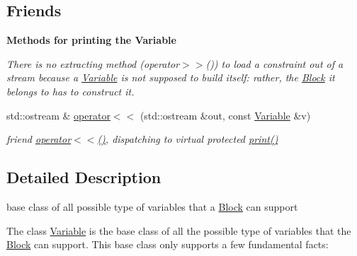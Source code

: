 \subsection*{Friends}
\begin{Indent}\textbf{ Methods for printing the Variable}\par
{\em There is no extracting method (operator$>$$>$()) to load a constraint out of a stream because a \mbox{\hyperlink{class_s_m_spp__di__unipi__it_1_1_variable}{Variable}} is not supposed to build itself\+: rather, the \mbox{\hyperlink{class_s_m_spp__di__unipi__it_1_1_block}{Block}} it belongs to has to construct it. }\begin{DoxyCompactItemize}
\item 
std\+::ostream \& \mbox{\hyperlink{class_s_m_spp__di__unipi__it_1_1_variable_a18ae89d67d3eb2df1392ec86afe3eeb1}{operator$<$$<$}} (std\+::ostream \&out, const \mbox{\hyperlink{class_s_m_spp__di__unipi__it_1_1_variable}{Variable}} \&v)
\begin{DoxyCompactList}\small\item\em friend \mbox{\hyperlink{class_s_m_spp__di__unipi__it_1_1_variable_a18ae89d67d3eb2df1392ec86afe3eeb1}{operator$<$$<$()}}, dispatching to virtual protected \mbox{\hyperlink{class_s_m_spp__di__unipi__it_1_1_variable_a2e7b9c9148a98c5c342e8c25cac95926}{print()}} \end{DoxyCompactList}\end{DoxyCompactItemize}
\end{Indent}


\subsection{Detailed Description}
base class of all possible type of variables that a \mbox{\hyperlink{class_s_m_spp__di__unipi__it_1_1_block}{Block}} can support 

The class \mbox{\hyperlink{class_s_m_spp__di__unipi__it_1_1_variable}{Variable}} is the base class of all the possible type of variables that the \mbox{\hyperlink{class_s_m_spp__di__unipi__it_1_1_block}{Block}} can support. This base class only supports a few fundamental facts\+:


